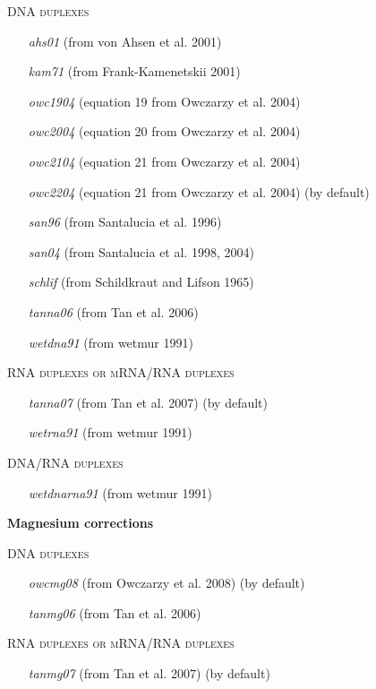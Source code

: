 \documentclass{article}
\begin{document}
\begin{description}
    \textsc{DNA duplexes}
      \begin{itemize}
      \item [\textit{ahs01}] (from von Ahsen et al. 2001)
      \item [\textit{kam71}] (from Frank-Kamenetskii 2001)
      \item [\textit{owc1904}] (equation 19 from Owczarzy et al. 2004)
      \item [\textit{owc2004}] (equation 20 from Owczarzy et al. 2004)
      \item [\textit{owc2104}] (equation 21 from Owczarzy et al. 2004)
      \item [\textit{owc2204}] (equation 21 from Owczarzy et al. 2004)  (by default)
      \item [\textit{san96}] (from Santalucia et al. 1996)
      \item [\textit{san04}] (from Santalucia et al. 1998, 2004)
      \item [\textit{schlif}] (from Schildkraut and Lifson 1965)
      \item [\textit{tanna06}] (from Tan et al. 2006)
      \item [\textit{wetdna91}] (from wetmur 1991)	 
      \end{itemize}
    \textsc{RNA duplexes or mRNA/RNA duplexes}
      \begin{itemize}
      \item [\textit{tanna07}] (from Tan et al. 2007)  (by default)
      \item [\textit{wetrna91}] (from wetmur 1991)	 
      \end{itemize}
    \textsc{DNA/RNA duplexes}
      \begin{itemize}
      \item [\textit{wetdnarna91}] (from wetmur 1991)	 
      \end{itemize}
  
  \textbf{Magnesium corrections}
  
    \textsc{DNA duplexes}
      \begin{itemize}
      \item [\textit{owcmg08}] (from Owczarzy et al. 2008)  (by default)
      \item [\textit{tanmg06}] (from Tan et al. 2006)	  
      \end{itemize}
    \textsc{RNA duplexes or mRNA/RNA duplexes}
      \begin{itemize}
      \item [\textit{tanmg07}] (from Tan et al. 2007)  (by default)
      \end{itemize}
    

\end{description}
\end{document}
